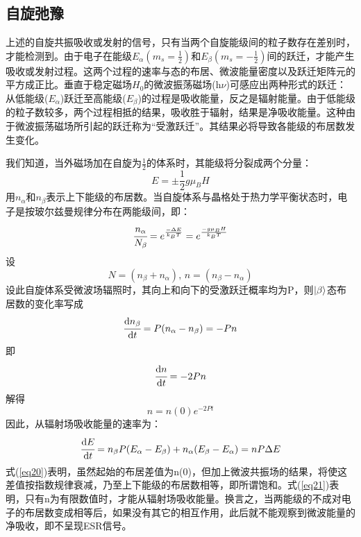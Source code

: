 \documentclass[a4paper]{article}
\begin{document}
\subsection{自旋弛豫}
上述的自旋共振吸收或发射的信号，只有当两个自旋能级间的粒子数存在差别时，才能检测到。由于电子在能级$E_{\alpha}(m_s = \frac{1}{2})$和$E_{\beta}(m_s = -\frac{1}{2})$间的跃迁，才能产生吸收或发射过程。这两个过程的速率与态的布居、微波能量密度以及跃迁矩阵元的平方成正比。垂直于稳定磁场$H_0$的微波振荡磁场(h$\nu$)可感应出两种形式的跃迁：从低能级($E_{\alpha}$)跃迁至高能级($E_{\beta}$)的过程是吸收能量，反之是辐射能量。由于低能级的粒子数较多，两个过程相抵的结果，吸收胜于辐射，结果是净吸收能量。这种由于微波振荡磁场所引起的跃迁称为“受激跃迁”。其结果必将导致各能级的布居数发生变化。

我们知道，当外磁场加在自旋为$\frac{1}{2}$的体系时，其能级将分裂成两个分量：
\begin{equation}
E = \pm\frac{1}{2}g\mu_B H\label{eq14}
\end{equation}
用$n_{\alpha}$和$n_{\beta}$表示上下能级的布居数。当自旋体系与晶格处于热力学平衡状态时，电子是按玻尔兹曼规律分布在两能级间，即：
\begin{equation}
\cfrac{n_{\alpha}}{N_{\beta}} = e^{\frac{-\Delta E}{k_BT}} = e^{\frac{-g\mu_B H}{k_BT}}\label{eq15}
\end{equation}
设
\begin{equation*}
N = (n_{\beta} + n_{\alpha})\text{, }n = (n_{\beta} - n_{\alpha})
\end{equation*}
设此自旋体系受微波场辐照时，其向上和向下的受激跃迁概率均为P，则$\ket{\beta}$态布居数的变化率写成
\begin{equation}
\cfrac{\text{d}n_{\beta}}{\text{d}t} = P(n_{\alpha} - n_{\beta}) = -Pn\label{eq18}
\end{equation}
即
\begin{equation}
\cfrac{\text{d}n}{\text{d}t} = -2Pn\label{eq19}
\end{equation}
解得
\begin{equation}
n = n(0)e^{-2Pt}\label{eq20}
\end{equation}
因此，从辐射场吸收能量的速率为：
\begin{equation}
\cfrac{\text{d}E}{\text{d}t} = n_{\beta}P(E_{\alpha} - E_{\beta}) + n_{\alpha}(E_{\beta} - E_{\alpha}) = nP\Delta E\label{eq21}
\end{equation}
式(\ref{eq20})表明，虽然起始的布居差值为n(0)，但加上微波共振场的结果，将使这差值按指数规律衰减，乃至上下能级的布居数相等，即所谓饱和。式(\ref{eq21})表明，只有n为有限数值时，才能从辐射场吸收能量。换言之，当两能级的不成对电子的布居数变成相等后，如果没有其它的相互作用，此后就不能观察到微波能量的净吸收，即不呈现ESR信号。
\end{document}
